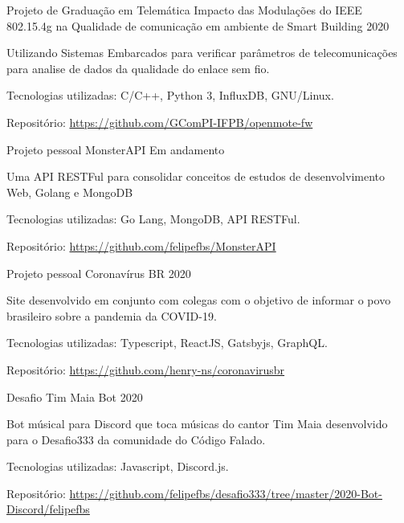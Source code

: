 
\begin{cventries}
  \cventry
  {Projeto de Graduação em Telemática} %
  {Impacto das Modulações do IEEE 802.15.4g na Qualidade de comunicação em ambiente de Smart Building} %
  {} %
  {2020} %
  {
    \begin{cvitems} %
      \item {Utilizando Sistemas Embarcados para verificar parâmetros de telecomunicações para analise de dados da qualidade do enlace sem fio.}
      \item {Tecnologias utilizadas: C/C++, Python 3, InfluxDB, GNU/Linux.}
      \item {Repositório: \url{https://github.com/GComPI-IFPB/openmote-fw}}
    \end{cvitems}
  }

  \cventry
  {Projeto pessoal} %
  {MonsterAPI} %
  {} %
  {Em andamento} %
  {
    \begin{cvitems} %
      \item {Uma API RESTFul para consolidar conceitos de estudos de desenvolvimento Web, Golang e MongoDB}
      \item {Tecnologias utilizadas: Go Lang, MongoDB, API RESTFul.}
      \item {Repositório: \url{https://github.com/felipefbs/MonsterAPI}}
    \end{cvitems}
  }

  \cventry
  {Projeto pessoal} %
  {Coronavírus BR} %
  {} %
  {2020} %
  {
    \begin{cvitems} %
      \item {Site desenvolvido em conjunto com colegas com o objetivo de informar o povo brasileiro sobre a pandemia da COVID-19.}
      \item {Tecnologias utilizadas: Typescript, ReactJS, Gatsbyjs, GraphQL.}
      \item {Repositório: \url{https://github.com/henry-ns/coronavirusbr}}
    \end{cvitems}
  }

  \cventry
  {Desafio} %
  {Tim Maia Bot} %
  {} %
  {2020} %
  {
    \begin{cvitems} %
      \item {Bot músical para Discord que toca músicas do cantor Tim Maia desenvolvido para o Desafio333 da comunidade do Código Falado.}
      \item {Tecnologias utilizadas: Javascript, Discord.js.}
      \item {Repositório: \url{https://github.com/felipefbs/desafio333/tree/master/2020-Bot-Discord/felipefbs}}
    \end{cvitems}
  }


\end{cventries}
